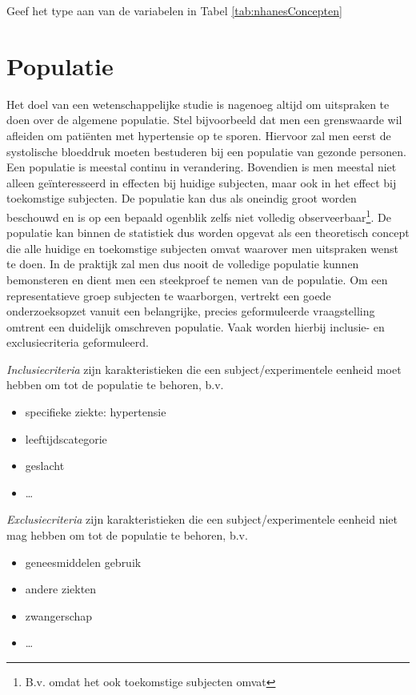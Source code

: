 \documentclass[12pt,dutch,coursenotes]{book}
\providecommand{\tightlist}{%
  \setlength{\itemsep}{0pt}\setlength{\parskip}{0pt}}
\let\rmarkdownfootnote\footnote%
\def\footnote{\protect\rmarkdownfootnote}
\theoremstyle{definition}
\theoremstyle{definition}
\theoremstyle{definition}
\theoremstyle{remark}
\let\BeginKnitrBlock\begin \let\EndKnitrBlock\end
\begin{document}
\BeginKnitrBlock{example}[oefening]
\protect\hypertarget{exm:unnamed-chunk-3}{}{\label{exm:unnamed-chunk-3}
\iffalse (oefening) \fi{} }Geef het type aan van de variabelen in Tabel
\ref{tab:nhanesConcepten}
\EndKnitrBlock{example}

\section{Populatie}\label{subsec:pop}

Het doel van een wetenschappelijke studie is nagenoeg altijd om
uitspraken te doen over de algemene populatie. Stel bijvoorbeeld dat men
een grenswaarde wil afleiden om patiënten met hypertensie op te sporen.
Hiervoor zal men eerst de systolische bloeddruk moeten bestuderen bij
een populatie van gezonde personen. Een populatie is meestal continu in
verandering. Bovendien is men meestal niet alleen geïnteresseerd in
effecten bij huidige subjecten, maar ook in het effect bij toekomstige
subjecten. De populatie kan dus als oneindig groot worden beschouwd en
is op een bepaald ogenblik zelfs niet volledig observeerbaar\footnote{B.v.
  omdat het ook toekomstige subjecten omvat}. De populatie kan binnen de
statistiek dus worden opgevat als een theoretisch concept die alle
huidige en toekomstige subjecten omvat waarover men uitspraken wenst te
doen. In de praktijk zal men dus nooit de volledige populatie kunnen
bemonsteren en dient men een steekproef te nemen van de populatie. Om
een representatieve groep subjecten te waarborgen, vertrekt een goede
onderzoeksopzet vanuit een belangrijke, precies geformuleerde
vraagstelling omtrent een duidelijk omschreven populatie. Vaak worden
hierbij inclusie- en exclusiecriteria geformuleerd.

\emph{Inclusiecriteria} zijn karakteristieken die een
subject/experimentele eenheid moet hebben om tot de populatie te
behoren, b.v.

\begin{itemize}
\tightlist
\item
  specifieke ziekte: hypertensie
\item
  leeftijdscategorie
\item
  geslacht
\item
  \ldots{}
\end{itemize}

\emph{Exclusiecriteria} zijn karakteristieken die een
subject/experimentele eenheid niet mag hebben om tot de populatie te
behoren, b.v.

\begin{itemize}
\tightlist
\item
  geneesmiddelen gebruik
\item
  andere ziekten
\item
  zwangerschap
\item
  \ldots{}
\end{itemize}
\end{document}
